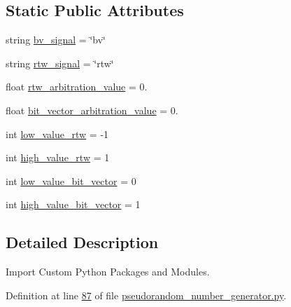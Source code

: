 \subsection*{Static Public Attributes}
\begin{DoxyCompactItemize}
\item 
string \hyperlink{classrandom__process__models_1_1pseudorandom__number__generator_1_1prng_a82f57253641d85b4e2efba66fac47066}{bv\+\_\+signal} = \char`\"{}bv\char`\"{}
\item 
string \hyperlink{classrandom__process__models_1_1pseudorandom__number__generator_1_1prng_a6962172d81af8d6c172ba64e33eb0d55}{rtw\+\_\+signal} = \char`\"{}rtw\char`\"{}
\item 
float \hyperlink{classrandom__process__models_1_1pseudorandom__number__generator_1_1prng_a90c8ad6b1e19cfb7a8e9eea3f2c16728}{rtw\+\_\+arbitration\+\_\+value} = 0.
\item 
float \hyperlink{classrandom__process__models_1_1pseudorandom__number__generator_1_1prng_ac3727731f4680b560c9856dce63b59b5}{bit\+\_\+vector\+\_\+arbitration\+\_\+value} = 0.
\item 
int \hyperlink{classrandom__process__models_1_1pseudorandom__number__generator_1_1prng_adf3f03d77c73d020e031922b1e8ef1b4}{low\+\_\+value\+\_\+rtw} = -\/1
\item 
int \hyperlink{classrandom__process__models_1_1pseudorandom__number__generator_1_1prng_af12063b0aa05ec3b1cb998eb59af1b39}{high\+\_\+value\+\_\+rtw} = 1
\item 
int \hyperlink{classrandom__process__models_1_1pseudorandom__number__generator_1_1prng_a74806f6f1dfe673c2132e8c4ec4f0ac2}{low\+\_\+value\+\_\+bit\+\_\+vector} = 0
\item 
int \hyperlink{classrandom__process__models_1_1pseudorandom__number__generator_1_1prng_a3ff9b0f7e6c786c43774225d9ae911ce}{high\+\_\+value\+\_\+bit\+\_\+vector} = 1
\end{DoxyCompactItemize}


\subsection{Detailed Description}
Import Custom Python Packages and Modules. 

Definition at line \hyperlink{pseudorandom__number__generator_8py_source_l00087}{87} of file \hyperlink{pseudorandom__number__generator_8py_source}{pseudorandom\+\_\+number\+\_\+generator.\+py}.



